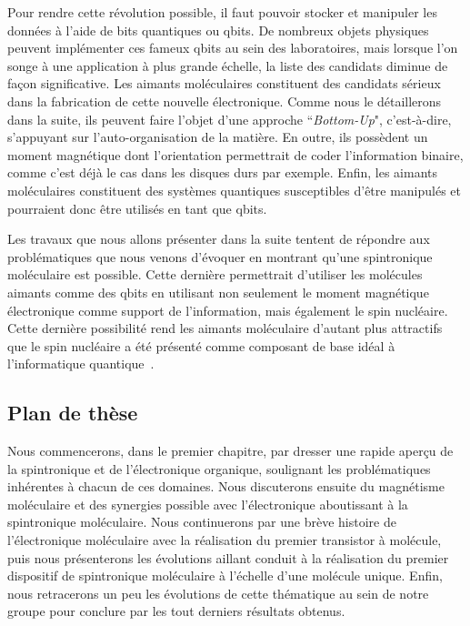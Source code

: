 Pour rendre cette révolution possible, il faut pouvoir stocker et manipuler les données à l'aide de bits quantiques ou qbits. De nombreux objets physiques peuvent implémenter ces fameux qbits au sein des laboratoires, mais lorsque l'on songe à une application à plus grande échelle, la liste des candidats diminue de façon significative. Les aimants moléculaires constituent des candidats sérieux dans la fabrication de cette nouvelle électronique. Comme nous le détaillerons dans la suite, ils peuvent faire l'objet d'une approche ``\textit{Bottom-Up}", c'est-à-dire, s'appuyant sur l'auto-organisation de la matière. En outre, ils possèdent un moment magnétique dont l'orientation permettrait de coder l'information binaire, comme c'est déjà le cas dans les disques durs par exemple. Enfin, les aimants moléculaires constituent des systèmes quantiques susceptibles d'\^etre manipulés et pourraient donc \^etre utilisés en tant que qbits.

Les travaux que nous allons présenter dans la suite tentent de répondre aux problématiques que nous venons d'évoquer en montrant qu'une spintronique moléculaire est possible. Cette dernière permettrait d'utiliser les molécules aimants comme des qbits en utilisant non seulement le moment magnétique électronique comme support de l'information, mais également le spin nucléaire. Cette dernière possibilité rend les aimants moléculaire d'autant plus attractifs que le spin nucléaire a été présenté comme composant de base idéal à l'informatique quantique~\cite{Kane1998}.

\subsection*{Plan de thèse}

Nous commencerons, dans le premier chapitre, par dresser une rapide aperçu de la spintronique et de l'électronique organique, soulignant les problématiques inhérentes à  chacun de ces domaines. Nous discuterons ensuite du magnétisme moléculaire et des synergies possible avec l'électronique aboutissant à la spintronique moléculaire. Nous continuerons par une brève histoire de l'électronique moléculaire avec la réalisation du premier transistor à molécule, puis nous présenterons les évolutions aillant conduit à la réalisation du premier dispositif de spintronique moléculaire à l'échelle d'une molécule unique. Enfin, nous retracerons un peu les évolutions de cette thématique au sein de notre groupe pour conclure par les tout derniers résultats obtenus.

